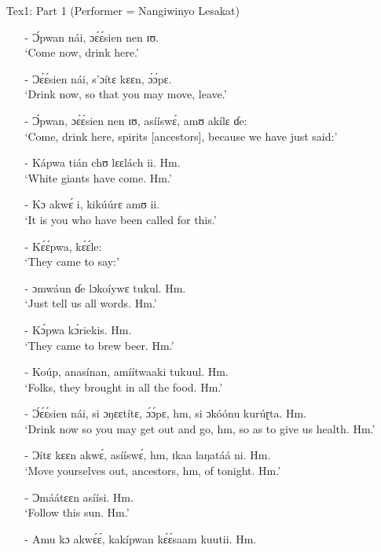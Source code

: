 \documentclass[output=paper,colorlinks,citecolor=brown]{langscibook}
\begin{document}
\begin{enumerate}
    \item[]     Tex1: Part 1 (Performer = Nangiwinyo Lesakat)
    \begin{enumerate}
    \item[-]    Ɔ́pwan nái, ɔɛ́ɛ́sien nen ɪʊ.\\
                `Come now, drink here.'
    \item[-]     Ɔɛ́ɛ́sien nái, s’ɔítɛ kɛɛn, ɔ́ɔ́pɛ. \\
                `Drink now, so that you may move, leave.'
    \item[-]     Ɔ́pwan, ɔɛ́ɛ́sien nen ɪʊ, asííswɛ́, amʊ akílɛ ɗe:\\
                `Come, drink here, spirits [ancestors], because we have just said:'
    \item[-]     Kápwa tián chʊ lɛɛlách ii. Hm.\\
                `White giants have come. Hm.' 
    \item[-]     Kɔ akwɛ́ i, kikúúrɛ amʊ ii. \\
                `It is you who have been called for this.'
    \item[-]     Kɛ́ɛ́pwa, kɛ́ɛ́le:\\
                `They came to say:'
    \item[-]     ɔmwáun ɗe lɔkoíywɛ tukul. Hm. \\
                `Just tell us all words. Hm.'
    \item[-]     Kɔ́pwa kɔ́riekis. Hm.\\
                `They came to brew beer. Hm.'
    \item[-]     Koúp, anasínan, amíítwaaki tukuul. Hm. \\
                `Folks, they brought in all the food. Hm.'
    \item[-]     Ɔ́ɛ́ɛ́sien nái, si ɔŋɛɛtítɛ, ɔ́ɔ́pɛ, hm, si ɔkóónu kurúɽta. Hm.\\
                `Drink now so you may get out and go, hm, so as to give us health. Hm.'
    \item[-]     Ɔítɛ kɛɛn akwɛ́, asííswɛ́, hm, ɪkaa laŋatáá ni. Hm. \\
                `Move yourselves out, ancestors, hm, of tonight. Hm.'
    \item[-]     Ɔmáátɛɛn asíísi. Hm.\\
                `Follow this sun. Hm.'
    \item[-]     Amu kɔ akwɛ́ɛ́, kakípwan kɛ́ɛ́saam kuutii. Hm.\\

\end{enumerate}
\end{enumerate}
\end{document}
